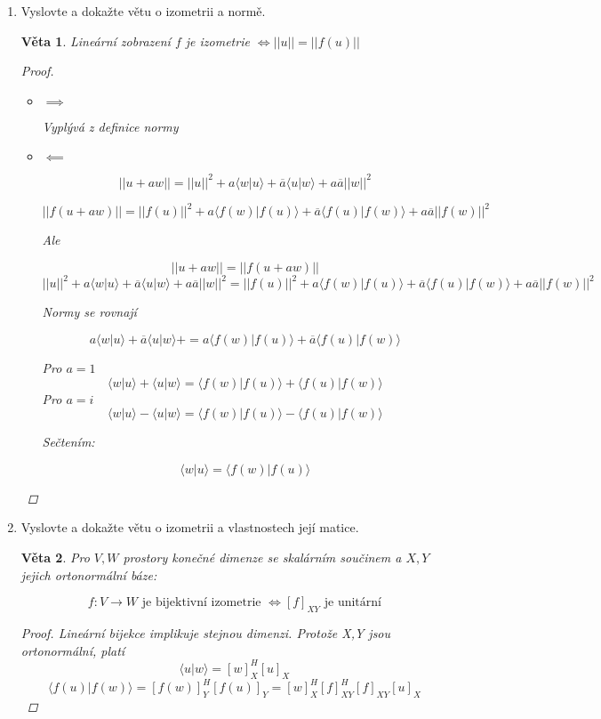 \documentclass[10pt,a4paper]{article}
\theoremstyle{plain}
\newtheorem{veta}{Věta}
\begin{document}
\begin{enumerate}
\item Vyslovte a dokažte větu o izometrii a normě.

\begin{veta}
Lineární zobrazení $f$ je izometrie $\iff ||u|| = ||f(u)||$ 
\begin{proof}\begin{itemize}
\item $\implies$ 

Vyplývá z definice normy
\item $\impliedby$

\[ ||u + aw|| = ||u||^2 + a \langle w|u \rangle + \overline{a}\langle u | w \rangle + a\overline{a} ||w||^2 \]

\[ ||f(u + aw)|| = ||f(u)||^2 + a \langle f(w)|f(u) \rangle + \overline{a}\langle f(u)| f(w) \rangle + a\overline{a} ||f(w)||^2 \]

Ale 

\[ ||u + aw|| = ||f(u + aw)|| \]
\[ ||u||^2 + a \langle w|u \rangle + \overline{a}\langle u | w \rangle + a\overline{a} ||w||^2 = ||f(u)||^2 + a \langle f(w)|f(u) \rangle + \overline{a}\langle f(u)| f(w) \rangle + a\overline{a} ||f(w)||^2  \]

Normy se rovnají

\[  a \langle w|u \rangle + \overline{a}\langle u | w \rangle +  =  a \langle f(w)|f(u) \rangle + \overline{a}\langle f(u)| f(w) \rangle \]

Pro $a = 1$
\[  \langle w|u \rangle + \langle u | w \rangle   =   \langle f(w)|f(u) \rangle + \langle f(u)| f(w) \rangle \]
Pro $a = i$
\[  \langle w|u \rangle -\langle u | w \rangle  =   \langle f(w)|f(u) \rangle -\langle f(u)| f(w) \rangle \]

Sečtením:

\[  \langle w|u \rangle   =   \langle f(w)|f(u) \rangle  \]
\end{itemize}\end{proof}
\end{veta}

\item Vyslovte a dokažte větu o izometrii a vlastnostech její matice.
\begin{veta}
Pro $V,W$ prostory konečné dimenze se skalárním součinem a $X,Y$ jejich ortonormální báze:

\[ f: V \to W \text{ je bijektivní izometrie } \iff [f]_{XY} \text{ je unitární}\]
\begin{proof}
Lineární bijekce implikuje stejnou dimenzi. Protože X,Y jsou ortonormální, platí
\[ \langle u | w \rangle = [w]_X^H[u]_X\]
\[ \langle f(u) | f(w) \rangle = [f(w)]_Y^H[f(u)]_Y = [w]^H_X[f]^H_{XY}[f]_{XY}[u]_X\]


\end{proof}
\end{veta}
\end{enumerate}
\end{document}
